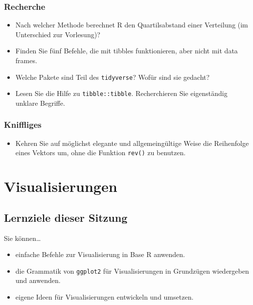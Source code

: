 \documentclass[
  ngerman,
]{article}
\providecommand{\tightlist}{%
  \setlength{\itemsep}{0pt}\setlength{\parskip}{0pt}}
\begin{document}
\hypertarget{recherche-1}{%
\subsubsection{Recherche}\label{recherche-1}}

\begin{itemize}
\tightlist
\item
  Nach welcher Methode berechnet R den Quartilsabstand einer Verteilung (im Unterschied zur Vorlesung)?
\item
  Finden Sie fünf Befehle, die mit tibbles funktionieren, aber nicht mit data frames.
\item
  Welche Pakete sind Teil des \texttt{tidyverse}? Wofür sind sie gedacht?
\item
  Lesen Sie die Hilfe zu \texttt{tibble::tibble}. Recherchieren Sie eigenständig unklare Begriffe.
\end{itemize}

\hypertarget{kniffliges-1}{%
\subsubsection{Kniffliges}\label{kniffliges-1}}

\begin{itemize}
\tightlist
\item
  Kehren Sie auf möglichst elegante und allgemeingültige Weise die Reihenfolge eines Vektors um, ohne die Funktion \texttt{rev()} zu benutzen.
\end{itemize}

\hypertarget{visualisierungen}{%
\section{Visualisierungen}\label{visualisierungen}}

\hypertarget{lernziele-dieser-sitzung-1}{%
\subsection{Lernziele dieser Sitzung}\label{lernziele-dieser-sitzung-1}}

Sie können\ldots{}

\begin{itemize}
\tightlist
\item
  einfache Befehle zur Visualisierung in Base R anwenden.
\item
  die Grammatik von \texttt{ggplot2} für Visualisierungen in Grundzügen wiedergeben und anwenden.
\item
  eigene Ideen für Visualisierungen entwickeln und umsetzen.
\end{itemize}
\end{document}
